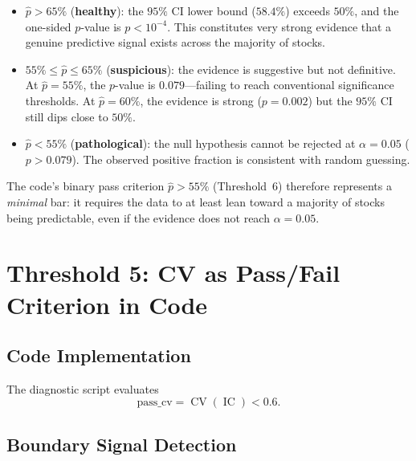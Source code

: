 \documentclass[11pt,a4paper]{article}
\theoremstyle{definition}
\newcommand{\IC}{\operatorname{IC}}
\newcommand{\CV}{\operatorname{CV}}
\begin{document}
\begin{itemize}
    \item $\hat{p} > 65\%$ (\textbf{healthy}): the $95\%$ CI lower bound
          ($58.4\%$) exceeds $50\%$, and the one-sided $p$-value is
          $p < 10^{-4}$.  This constitutes very strong evidence
          that a genuine predictive signal exists across the majority of stocks.

    \item $55\% \leq \hat{p} \leq 65\%$ (\textbf{suspicious}): the evidence
          is suggestive but not definitive.  At $\hat{p} = 55\%$, the
          $p$-value is $0.079$---failing to reach conventional significance
          thresholds.  At $\hat{p} = 60\%$, the evidence is strong ($p=0.002$)
          but the $95\%$ CI still dips close to $50\%$.

    \item $\hat{p} < 55\%$ (\textbf{pathological}): the null hypothesis
          cannot be rejected at $\alpha = 0.05$ ($p > 0.079$).  The observed
          positive fraction is consistent with random guessing.
\end{itemize}

The code's binary pass criterion $\hat{p} > 55\%$ (Threshold~6) therefore
represents a \emph{minimal} bar: it requires the data to at least lean
toward a majority of stocks being predictable, even if the evidence does not
reach $\alpha = 0.05$.

\section{Threshold 5: CV as Pass/Fail Criterion in Code}

\subsection{Code Implementation}

The diagnostic script evaluates
\begin{equation}
    \text{pass\_cv} = \CV(\IC) < 0.6.
\end{equation}

\subsection{Boundary Signal Detection}
\end{document}
